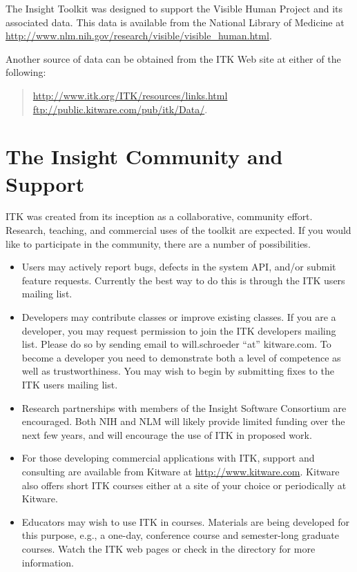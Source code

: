 The Insight Toolkit was designed to support the Visible Human Project
and its associated data. This data is available from the National Library of
Medicine at \url{http://www.nlm.nih.gov/research/visible/visible_human.html}.

Another source of data can be obtained from the ITK Web site at either
of the following:
\begin{quote}
\url{http://www.itk.org/ITK/resources/links.html} \\
\url{ftp://public.kitware.com/pub/itk/Data/}.
\end{quote}

\section{The Insight Community and Support}
\label{sec:AdditionalResources}

ITK was created from its inception as a collaborative, community
effort. Research, teaching, and commercial uses of the toolkit are
expected. If you would like to participate in the community, there are a
number of possibilities.

\begin{itemize}
       \item Users may actively report bugs, defects in the system API,
       and/or submit feature requests. Currently the best way to do this is
       through the ITK users mailing list.

       \item Developers may contribute classes or improve existing
       classes. If you are a developer, you may request permission to join
       the ITK developers mailing list. Please do so by sending email to
       will.schroeder ``at'' kitware.com. To become a developer you need to
       demonstrate both a level of competence as well as
       trustworthiness. You may wish to begin by submitting fixes to the ITK
       users mailing list.

       \item Research partnerships with members of the Insight Software
       Consortium are encouraged. Both NIH and NLM will likely provide
       limited funding over the next few years, and will encourage the use of
       ITK in proposed work.

       \item For those developing commercial applications with ITK,
       support and consulting are available from Kitware at
       \url{http://www.kitware.com}. Kitware also offers short ITK courses
       either at a site of your choice or periodically at Kitware.

       \item Educators may wish to use ITK in courses. Materials are being
       developed for this purpose, e.g., a one-day, conference course and
       semester-long graduate courses. Watch the ITK web pages or check in
       the  directory for more information.
\end{itemize}

